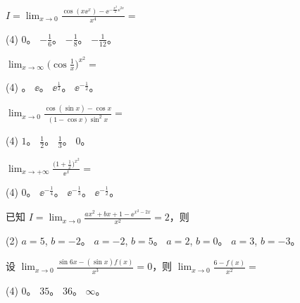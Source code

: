 \begin{ti}
	$I = \lim_{x \to 0} \frac{\cos( x\ee^x ) - \ee^{-\frac{x^2}{2} \ee^{2x}}}{x^4} = $
	\begin{tasks}(4)
		\task $0$。
		\task $-\frac{1}{6}$。
		\task $-\frac{1}{8}$。
		\task $-\frac{1}{12}$。
	\end{tasks}
\end{ti}

\begin{ti}
	$\lim_{x \to \infty} \biggl( \cos\frac{1}{x} \biggr)^{x^2} = $
	\begin{tasks}(4)
		。
		\task $\ee$。
		\task $\ee^{\frac{1}{2}}$。
		\task $\ee^{-\frac{1}{2}}$。
	\end{tasks}
\end{ti}

\begin{ti}
	$\lim_{x \to 0} \frac{\cos(\sin x) - \cos x}{(1 - \cos x) \sin^2x} = $
	\begin{tasks}(4)
		\task $1$。
		\task $\frac{1}{2}$。
		\task $\frac{1}{3}$。
		\task $0$。
	\end{tasks}
\end{ti}

\begin{ti}
	$\lim_{x \to +\infty} \frac{\bigl( 1 + \frac{1}{x} \bigr)^{x^2}}{\ee^x} = $
	\begin{tasks}(4)
		\task $0$。
		\task $\ee^{-\frac{1}{4}}$。
		\task $\ee^{-\frac{1}{3}}$。
		\task $\ee^{-\frac{1}{2}}$。
	\end{tasks}
\end{ti}

\begin{ti}
	已知 $I = \lim_{x \to 0} \frac{ax^2 + bx + 1 - \ee^{x^2-2x}}{x^2} = 2$，则
	\begin{tasks}(2)
		\task $a = 5$, $b = -2$。
		\task $a = -2$, $b = 5$。
		\task $a = 2$, $b = 0$。
		\task $a = 3$, $b = -3$。
	\end{tasks}
\end{ti}

\begin{ti}
	设 $\lim_{x \to 0} \frac{\sin 6x - (\sin x) f(x)}{x^3} = 0$，则 $\lim_{x \to 0} \frac{6-f(x)}{x^2} = $
	\begin{tasks}(4)
		\task $0$。
		\task $35$。
		\task $36$。
		\task $\infty$。
	\end{tasks}
\end{ti}